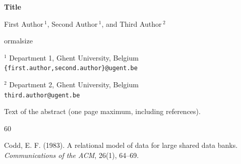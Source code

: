\documentclass[11pt]{article}
\begin{document}
\begin{center}
    \Large{\textbf{Title}}
    
    \vspace{0.5cm}
    
    
    \large{First Author$\,^1$, Second Author$\,^1$, and Third Author$\,^2$}
    
    \vspace{0.5cm}
    
    
ormalsize
    
    
    $^1$ Department 1, Ghent University, Belgium\\
    \texttt{\{first.author,second.author\}@ugent.be}
    
    $^2$ Department 2, Ghent University, Belgium\\
    \texttt{third.author@ugent.be}
    
    \vspace{0.6cm}
    
\end{center}

Text of the abstract (one page maximum, including references).

\begin{thebibliography}{60}

 Codd, E. F. (1983). A relational model of data for large shared data banks. \textit{Communications of the ACM}, 26(1), 64--69.

\end{thebibliography}
\end{document}
